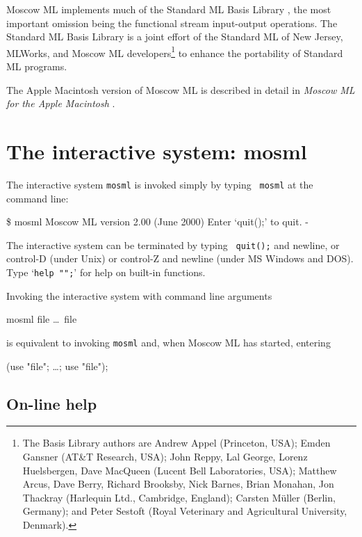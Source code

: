 \documentclass[fleqn]{article}
\begin{document}
Moscow ML implements much of the Standard ML Basis Library
\cite{SMLBasis:1996:StandardML}, the most important omission being the
functional stream input-output operations.  The Standard ML Basis
Library is a joint effort of the Standard ML of New Jersey, MLWorks,
and Moscow ML developers\footnote{The Basis Library authors are Andrew
  Appel (Princeton, USA); Emden Gansner (AT\&T Research, USA); John
  Reppy, Lal George, Lorenz Huelsbergen, Dave MacQueen (Lucent Bell
  Laboratories, USA); Matthew Arcus, Dave Berry, Richard Brooksby,
  Nick Barnes, Brian Monahan, Jon Thackray (Harlequin Ltd., Cambridge,
  England); Carsten M{\"u}ller (Berlin, Germany); and Peter Sestoft
  (Royal Veterinary and Agricultural University, Denmark).} to enhance
the portability of Standard ML programs.

The Apple Macintosh version of Moscow ML is described in detail in
\emph{Moscow ML for the Apple Macintosh}
\cite{Currie:1999:MoscowMLMac}.

\newpage

\section{The interactive system: mosml}
\label{sec-interactive-system}

The interactive system {\tt mosml} is invoked simply by typing {\tt
  mosml} at the command line:

\begin{program}
\$ mosml
Moscow ML version 2.00 (June 2000)
Enter `quit();' to quit.
- 
\end{program}

\noindent The interactive system can be terminated by typing {\tt
  quit();} and newline, or control-D (under Unix) or control-Z and
newline (under MS Windows and DOS).  Type `{\tt help "";}' for help on
built-in functions.

Invoking the interactive system with command line arguments

\begin{program}
mosml file \ldots\ file
\end{program}

\noindent is equivalent to invoking {\tt mosml} and, when Moscow ML
has started, entering

\begin{program}
(use "file"; \ldots; use "file");  
\end{program}


\subsection{On-line help}
\label{sec-mosml-help}
\end{document}
